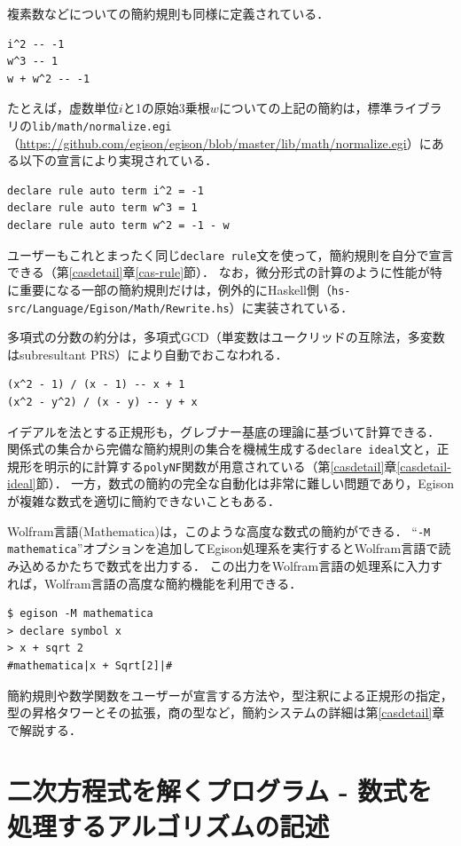 複素数などについての簡約規則も同様に定義されている．
\begin{lstlisting}[language=egison,numbers=none]
i^2 -- -1
w^3 -- 1
w + w^2 -- -1
\end{lstlisting}
たとえば，虚数単位$i$と1の原始3乗根$w$についての上記の簡約は，標準ライブラリの\texttt{lib/math/normalize.egi}（\url{https://github.com/egison/egison/blob/master/lib/math/normalize.egi}）にある以下の宣言により実現されている．
\begin{lstlisting}[language=egison,numbers=none]
declare rule auto term i^2 = -1
declare rule auto term w^3 = 1
declare rule auto term w^2 = -1 - w
\end{lstlisting}
ユーザーもこれとまったく同じ\lstinline{declare rule}文を使って，簡約規則を自分で宣言できる（第\ref{casdetail}章\ref{cas-rule}節）．
なお，微分形式の計算のように性能が特に重要になる一部の簡約規則だけは，例外的にHaskell側（\texttt{hs-src/Language/Egison/Math/Rewrite.hs}）に実装されている．

多項式の分数の約分は，多項式GCD（単変数はユークリッドの互除法，多変数はsubresultant PRS）により自動でおこなわれる．
\begin{lstlisting}[language=egison,numbers=none]
(x^2 - 1) / (x - 1) -- x + 1
(x^2 - y^2) / (x - y) -- y + x
\end{lstlisting}
イデアルを法とする正規形も，グレブナー基底の理論に基づいて計算できる．
関係式の集合から完備な簡約規則の集合を機械生成する\lstinline{declare ideal}文と，正規形を明示的に計算する\lstinline{polyNF}関数が用意されている（第\ref{casdetail}章\ref{casdetail-ideal}節）．
一方，数式の簡約の完全な自動化は非常に難しい問題であり，Egisonが複雑な数式を適切に簡約できないこともある．

Wolfram言語(Mathematica)は，このような高度な数式の簡約ができる．
``\texttt{-M mathematica}''オプションを追加してEgison処理系を実行するとWolfram言語で読み込めるかたちで数式を出力する．
この出力をWolfram言語の処理系に入力すれば，Wolfram言語の高度な簡約機能を利用できる．
\begin{lstlisting}[language=egison,numbers=none]
$ egison -M mathematica
> declare symbol x
> x + sqrt 2
#mathematica|x + Sqrt[2]|#
\end{lstlisting}

簡約規則や数学関数をユーザーが宣言する方法や，型注釈による正規形の指定，型の昇格タワーとその拡張，商の型など，簡約システムの詳細は第\ref{casdetail}章で解説する．

\section{二次方程式を解くプログラム - 数式を処理するアルゴリズムの記述}\label{cas-quadratic}

